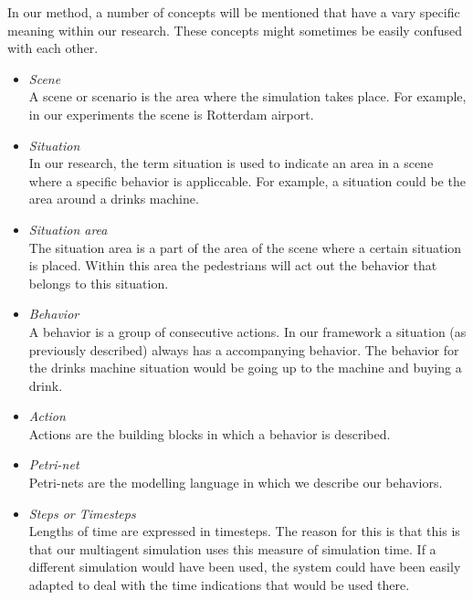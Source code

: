 \documentclass[11pt]{book}
\begin{document}
In our method, a number of concepts will be mentioned that have a vary specific meaning within our research. These concepts might sometimes be easily confused with each other.
\begin{itemize}
\item \emph{Scene}\\
A scene or scenario is the area where the simulation takes place. For example, in our experiments the scene is Rotterdam airport.
\item \emph{Situation}\\
In our research, the term situation is used to indicate an area in a scene where a specific behavior is appliccable. For example, a situation could be the area around a drinks machine.
\item \emph{Situation area}\\
The situation area is a part of the area of the scene where a certain situation is placed. Within this area the pedestrians will act out the behavior that belongs to this situation.
\item \emph{Behavior}\\
A behavior is a group of consecutive actions. In our framework a situation (as previously described) always has a accompanying behavior. The behavior for the drinks machine situation would be going up to the machine and buying a drink.
\item \emph{Action}\\
Actions are the building blocks in which a behavior is described.
\item \emph{Petri-net}\\
Petri-nets are the modelling language in which we describe our behaviors.
\item \emph{Steps or Timesteps}\\
Lengths of time are expressed in timesteps. The reason for this is that this is that our multiagent simulation uses this measure of simulation time. If a different simulation would have been used, the system could have been easily adapted to deal with the time indications that would be used there.

\end{itemize}
\end{document}
